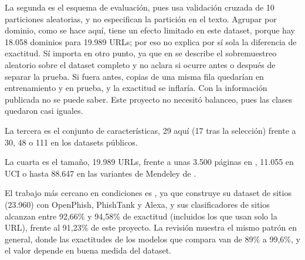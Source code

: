 La segunda es el esquema de evaluación, pues \cite{alsariera2020ai} usa validación cruzada de 10 particiones aleatorias, y \cite{kalabarige2022multilayer,kalabarige2023boosting} no especifican la partición en el texto. Agrupar por dominio, como se hace aquí, tiene un efecto limitado en este dataset, porque hay 18.058 dominios para 19.989 URLs; por eso no explica por sí sola la diferencia de exactitud. Sí importa en otro punto, ya que en \cite{kalabarige2022multilayer} se describe el sobremuestreo aleatorio sobre el dataset completo y no aclara si ocurre antes o después de separar la prueba. Si fuera antes, copias de una misma fila quedarían en entrenamiento y en prueba, y la exactitud se inflaría. Con la información publicada no se puede saber. Este proyecto no necesitó balanceo, pues las clases quedaron casi iguales. \newline

La tercera es el conjunto de características, 29 aquí (17 tras la selección) frente a 30, 48 o 111 en los datasets públicos. \newline

La cuarta es el tamaño, 19.989 URLs, frente a unas 3.500 páginas en \cite{rao2019detection}, 11.055 en UCI o hasta 88.647 en las variantes de Mendeley de \cite{kalabarige2022multilayer}. \newline

El trabajo más cercano en condiciones es \cite{duy2024study}, ya que construye su dataset de sitios (23.960) con OpenPhish, PhishTank y Alexa, y sus clasificadores de sitios alcanzan entre 92,66\% y 94,58\% de exactitud (incluidos los que usan solo la URL), frente al 91,23\% de este proyecto. La revisión \cite{ahmad2025across} muestra el mismo patrón en general, donde las exactitudes de los modelos que compara van de 89\% a 99,6\%, y el valor depende en buena medida del dataset.

